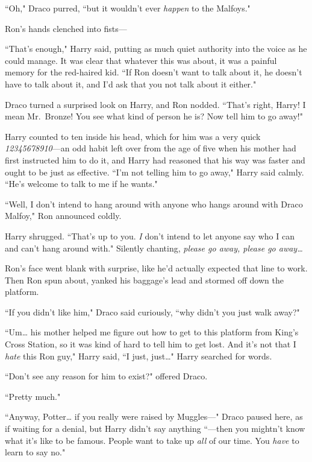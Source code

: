 ``Oh," Draco purred, ``but it wouldn't ever \emph{happen} to the Malfoys."

Ron's hands clenched into fists—

``That's enough," Harry said, putting as much quiet authority into the voice as he could manage. It was clear that whatever this was about, it was a painful memory for the red-haired kid. ``If Ron doesn't want to talk about it, he doesn't have to talk about it, and I'd ask that you not talk about it either."

Draco turned a surprised look on Harry, and Ron nodded. ``That's right, Harry! I mean Mr.~Bronze! You see what kind of person he is? Now tell him to go away!"

Harry counted to ten inside his head, which for him was a very quick \emph{12345678910}—an odd habit left over from the age of five when his mother had first instructed him to do it, and Harry had reasoned that his way was faster and ought to be just as effective. ``I'm not telling him to go away," Harry said calmly. ``He's welcome to talk to me if he wants."

``Well, I don't intend to hang around with anyone who hangs around with Draco Malfoy," Ron announced coldly.

Harry shrugged. ``That's up to you. \emph{I} don't intend to let anyone say who I can and can't hang around with." Silently chanting, \emph{please go away, please go away{\ldots}}

Ron's face went blank with surprise, like he'd actually expected that line to work. Then Ron spun about, yanked his baggage's lead and stormed off down the platform.

``If you didn't like him," Draco said curiously, ``why didn't you just walk away?"

``Um{\ldots} his mother helped me figure out how to get to this platform from King's Cross Station, so it was kind of hard to tell him to get lost. And it's not that I \emph{hate} this Ron guy," Harry said, ``I just, just{\ldots}" Harry searched for words.

``Don't see any reason for him to exist?" offered Draco.

``Pretty much."

``Anyway, Potter{\ldots} if you really were raised by Muggles—" Draco paused here, as if waiting for a denial, but Harry didn't say anything ``—then you mightn't know what it's like to be famous. People want to take up \emph{all} of our time. You \emph{have} to learn to say no."

